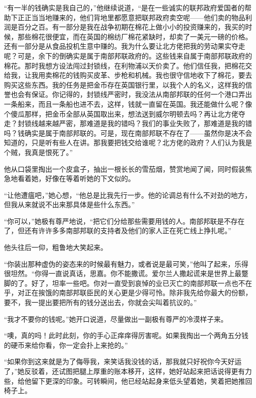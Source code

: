 \par “有一半的钱确实是我自己的，”他继续说道，“是在一些诚实的联邦政府爱国者的帮助下正正当当地赚来的，他们背地里都愿意把联邦政府卖空呢——他们卖的物品利润是百分之百。有一部分是我在战争初期在棉花上做小小的投资赚来的，我买的时候，那些棉花很便宜，而在英国的棉纺厂棉花紧缺时，却卖了一美元一磅的价格。还有一部分是从食品投机生意中赚的。我为什么要让北方佬把我的劳动果实夺走呢？可是，余下的倒确实是属于南部邦联政府的。这些钱来自属于南部邦联政府的棉花。那时我想方设法闯过封锁线，在利物浦以天价卖了。他们信任我，把棉花交给我，让我用卖棉花的钱购买皮革、步枪和机械。我也很守信地收下了棉花，要去购买这些东西。我的任务是把金币存在英国银行里，以我个人的名义，这样我的信誉也会有保证。你记得的，封锁线严密时，我没法从南部邦联的任何一个港口弄出一条船来，而且一条船也进不去，这样，钱就一直留在英国。我还能做什么呢？像个傻瓜那样，把金币全部从英国取出来，想法送到威尔明顿去吗？再让北方佬夺走？封锁线越来越严密，那难道是我的错吗？我们的事业失败了，那难道是我的错吗？钱确实是属于南部邦联的。可是，现在南部邦联不存在了——虽然你是决不会知道的，只是听有些人在讲。那我要把钱交给谁呢？北方佬的政府？人们认为我是个贼，我真是恨死了。”
\par 他从口袋里掏出一个皮盒子，抽出一根长长的雪茄烟，赞赏地闻了闻，同时假装焦急地看着她，好像在等着听她的下文似的。
\par “让他遭瘟吧，”她心想，“他总是比我先行一步。他的论调总有什么不对劲的地方，但我从来就说不出来那具体是些什么东西。”
\par “你可以，”她极有尊严地说，“把它们分给那些需要用钱的人。南部邦联是不存在了，但还有许许多多南部邦联的支持者及他们的家人正在死亡线上挣扎呢。”
\par 他头往后一仰，粗鲁地大笑起来。
\par “你装出那种虚伪的姿态来的时候最有魅力，或者说是最可笑，”他叫了起来，乐得很坦然。“你得一直说真话，思嘉。你不能撒谎。爱尔兰人撒起谎来是世界上最蹩脚的了。好了，坦率一些吧。你对一直受到哀悼的业已灭亡的南部邦联一点也不在乎，对正在挨饿的南部邦联臣民的关心更是少得可怜。除非我先给你最大的份额，要不，我一提出要把所有的钱分送出去，你就会尖叫着抗议的。”
\par “我才不要你的钱呢。”她开口说道，尽量做出一副极有尊严的冷漠样子来。
\par “噢，真的吗！此时此刻，你的手心正痒痒得厉害呢。如果我掏出一个两角五分钱的硬币来给你看，你一定会扑上来抢的。”
\par “如果你到这来就是为了侮辱我，来笑话我没钱的话，那我就只好祝你今天好运了，”她反驳着，还试图把腿上厚重的账本移开，这样，她好站起来把话说得更有力些，给他留下更深的印象。可转瞬间，他已经站起身来低头望着她，笑着把她推回椅子上。
